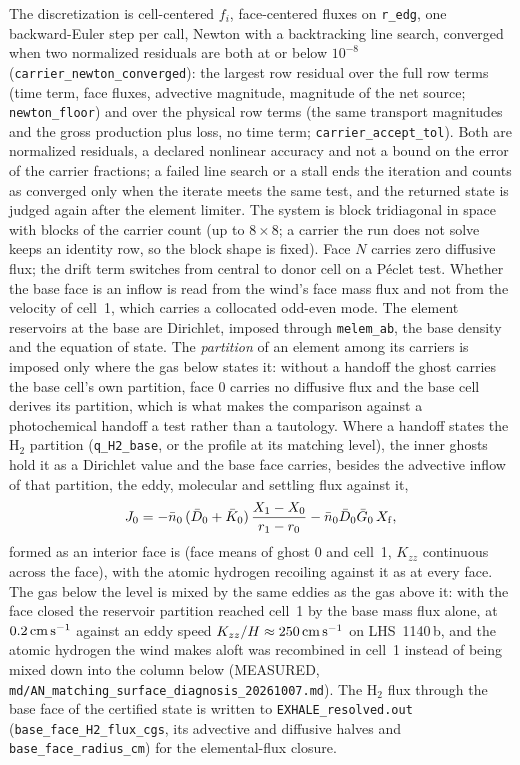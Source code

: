 The discretization is cell-centered $f_i$, face-centered fluxes on
\texttt{r\_edg}, one backward-Euler step per call, Newton with a
backtracking line search, converged when two normalized residuals are both
at or below $10^{-8}$ (\texttt{carrier\_newton\_converged}): the largest row
residual over the full row terms (time term, face fluxes, advective
magnitude, magnitude of the net source; \texttt{newton\_floor}) and over the
physical row terms (the same transport magnitudes and the gross production
plus loss, no time term; \texttt{carrier\_accept\_tol}).  Both are normalized
residuals, a declared nonlinear accuracy and not a bound on the error of the
carrier fractions; a failed line search or a stall ends the iteration and
counts as converged only when the iterate meets the same test, and the
returned state is judged again after the element limiter.  The system is
block tridiagonal in space with blocks of the
carrier count (up to $8\times8$; a carrier the run does not solve keeps an
identity row, so the block shape is fixed). Face $N$ carries zero
diffusive flux; the drift term switches from central to donor cell on a
P\'eclet test. Whether the base face is an inflow is read from the wind's
face mass flux and not from the velocity of cell~1, which carries a
collocated odd-even mode. The element reservoirs at the base are
Dirichlet, imposed through \texttt{melem\_ab}, the base density and the
equation of state. The \emph{partition} of an element among its carriers is
imposed only where the gas below states it: without a handoff the ghost
carries the base cell's own partition, face 0 carries no diffusive flux and
the base cell derives its partition, which is what makes the comparison
against a photochemical handoff a test rather than a tautology. Where a
handoff states the H$_2$ partition (\texttt{q\_H2\_base}, or the profile at
its matching level), the inner ghosts hold it as a Dirichlet value and the
base face carries, besides the advective inflow of that partition, the eddy,
molecular and settling flux against it,
\begin{equation}
J_0 = -\bar n_0\,(\bar D_0+\bar K_0)\,\frac{X_1-X_0}{r_1-r_0}
      - \bar n_0 \bar D_0 \bar G_0\,X_{\rm f},
\label{eq:mol:baseface}
\end{equation}
formed as an interior face is (face means of ghost 0 and cell~1, $K_{zz}$
continuous across the face), with the atomic hydrogen recoiling against it
as at every face. The gas below the level is mixed by the same eddies as the
gas above it: with the face closed the reservoir partition reached cell~1 by
the base mass flux alone, at $0.2\,{\rm cm\,s^{-1}}$ against an eddy speed
$K_{zz}/H\approx250\,{\rm cm\,s^{-1}}$ on LHS~1140\,b, and the atomic
hydrogen the wind makes aloft was recombined in cell~1 instead of being mixed
down into the column below (MEASURED,
\texttt{md/AN\_matching\_surface\_diagnosis\_20261007.md}). The H$_2$ flux
through the base face of the certified state is written to
\texttt{EXHALE\_resolved.out} (\texttt{base\_face\_H2\_flux\_cgs}, its
advective and diffusive halves and \texttt{base\_face\_radius\_cm}) for the
elemental-flux closure.

